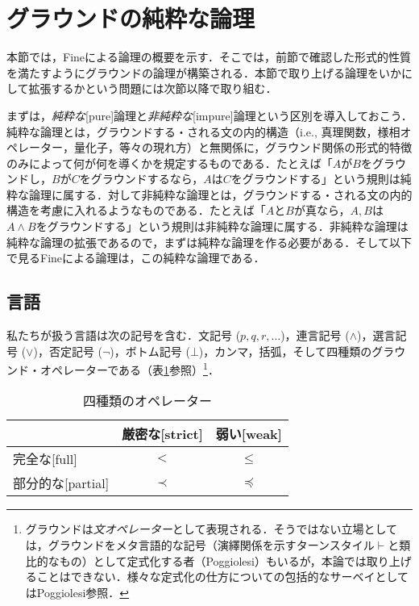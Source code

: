 \documentclass[twoside,14Q,uplatex,dvipdfmx]{jsarticle}
\theoremstyle{definition}
\begin{document}
\section{グラウンドの純粋な論理}\label{plg}
本節では，Fine\cite{Fine2012a,Fine2012b}による論理の概要を示す．そこでは，前節で確認した形式的性質を満たすようにグラウンドの論理が構築される．本節で取り上げる論理をいかにして拡張するかという問題には次節以降で取り組む．

まずは，\emph{純粋な}[pure]論理と\emph{非純粋な}[impure]論理という区別を導入しておこう．純粋な論理とは，グラウンドする・される文の内的構造（i.e., 真理関数，様相オペレーター，量化子，等々の現れ方）と無関係に，グラウンド関係の形式的特徴のみによって何が何を導くかを規定するものである．たとえば「$A$が$B$をグラウンドし，$B$が$C$をグラウンドするなら，$A$は$C$をグラウンドする」という規則は純粋な論理に属する．対して非純粋な論理とは，グラウンドする・される文の内的構造を考慮に入れるようなものである．たとえば「$A$と$B$が真なら，$A, B$は$A\land B$をグラウンドする」という規則は非純粋な論理に属する．非純粋な論理は純粋な論理の拡張であるので，まずは純粋な論理を作る必要がある．そして以下で見るFineによる論理は，この純粋な論理である．

\subsection{言語}
私たちが扱う言語は次の記号を含む．文記号 ($p, q, r,\ldots$)，連言記号 ($\land$)，選言記号 ($\lor$)，否定記号 ($\lnot$)，ボトム記号 ($\bot$)，カンマ，括弧，そして四種類のグラウンド・オペレーターである（表\ref{operator}参照）\footnote{グラウンドは\emph{文オペレーター}として表現される．そうではない立場としては，グラウンドをメタ言語的な記号（演繹関係を示すターンスタイル$\vdash$と類比的なもの）として定式化する者（Poggiolesi\cite{Poggiolesi2016,Poggiolesi2018}）もいるが，本論では取り上げることはできない．様々な定式化の仕方についての包括的なサーベイとしてはPoggiolesi\cite{Poggiolesi2020}参照．}．

\begin{table}[htb]
\centering
\caption{四種類のオペレーター}\label{operator}
  \begin{tabular}{l|cc}
    & 厳密な[strict] & 弱い[weak] \\ \hline
   完全な[full] & $<$ & $\leq$ \\
    部分的な[partial] & $\prec$ & $\preceq$ \\
  \end{tabular}
\end{table}
\end{document}

